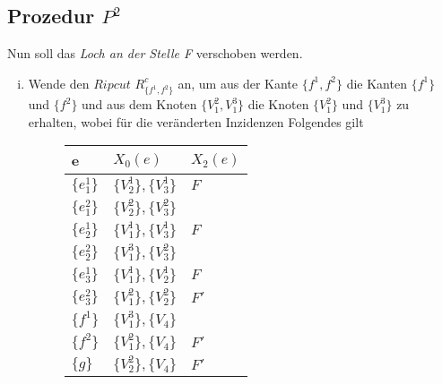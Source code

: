 \documentclass[12pt,titlepage,twoside,cleardoublepage]{article}
\theoremstyle{nummermitklammern}
\numberwithin{equation}{section}
\begin{document}
\subsection{Prozedur $P^2$}
 Nun soll das \emph{Loch an der Stelle F} verschoben werden. 
\begin{enumerate}[(i)]

\item Wende den $Ripcut$ $R^{c}_{\{f^1,f^2\}}$ an, um aus der Kante $\{f^1,f^2\}$ die Kanten $\{f^1\}$ und $\{f^2\}$ und aus dem Knoten $\{V_1^2,V_1^3\}$ die Knoten $\{V_1^2\}$ und $\{V_1^3\}$ zu erhalten, wobei für die veränderten Inzidenzen Folgendes gilt
\begin{figure}[H]
\begin{center}
\begin{tabularx}{\textwidth}{XXX}
\hline
\textbf{e}&\textbf{$X_0(e)$}&\textbf{$X_2(e)$}\\
 \hline
 $\{e_1^1\}$ & $\{V_2^1\},\{V_3^1\}$& $F$\\
  $\{e_1^2\}$ & $\{V_2^2\},\{V_3^2\}$&\\ 
  $\{e_2^1\}$&$\{V_1^1\},\{V_3^1\}$ & $F$\\
   $\{e_2^2\}$&$\{V_1^3\},\{V_3^2\}$ & \\
  $\{e_3^1\}$&$\{V_1^1\},\{V_2^1\}$ & $F$\\
  $\{e_3^2\}$&$\{V_1^2\},\{V_2^2\}$ & $F'$\\ 
   $\{f^1\}$&$\{V_1^3\},\{V_4\}$& \\
    $\{f^2\}$&$\{V_1^2\},\{V_4\}$& $F'$\\
   $\{g\}$ & $\{V_2^2\},\{V_4\}$ & $F'$ \\
 \end{tabularx}
\end{center} 
\begin{tikzpicture}[line cap=round,line join=round,>=triangle 45,x=1.0cm,y=1.0cm]


\end{tikzpicture}
\end{figure}
\end{enumerate}
\end{document}
